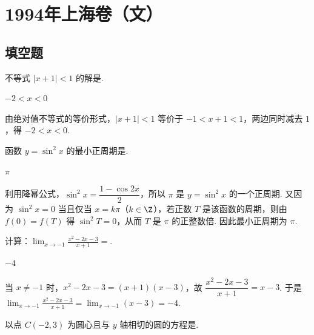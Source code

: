 \chapter{1994年上海卷（文）}
\section{填空题}

\begin{problem}
不等式 \(|x + 1| < 1 \) 的解是\fillinblank{}.
\end{problem}

\begin{answer}
\(-2 < x < 0\)
\end{answer}

\begin{solution}
由绝对值不等式的等价形式，\(|x+1|<1\) 等价于 \(-1<x+1<1\)，两边同时减去 \(1\)，得 \(-2<x<0\).
\end{solution}

\begin{problem}
函数 \(y = \sin^{2} x \) 的最小正周期是\fillinblank{}.
\end{problem}

\begin{answer}
\(\pi\)
\end{answer}

\begin{solution}
利用降幂公式，\(\sin^2x=\dfrac{1-\cos2x}{2}\)，所以 \(\pi\) 是 \(y=\sin^2x\) 的一个正周期. 又因为 \(\sin^2x=0\) 当且仅当 \(x=k\pi\)（\(k\in\Z\)），若正数 \(T\) 是该函数的周期，则由 \(f(0)=f(T)\) 得 \(\sin^2T=0\)，从而 \(T\) 是 \(\pi\) 的正整数倍. 因此最小正周期为 \(\pi\).
\end{solution}

\begin{problem}
计算：\(\displaystyle\lim_{x\to-1}\frac{x^{2}-2x-3}{x+1}= \)\fillinblank{}.
\end{problem}

\begin{answer}
\(-4\)
\end{answer}

\begin{solution}
当 \(x\ne-1\) 时，\(x^2-2x-3=(x+1)(x-3)\)，故
\(\dfrac{x^2-2x-3}{x+1}=x-3\). 于是
\(\displaystyle\lim_{x\to-1}\frac{x^2-2x-3}{x+1}=\lim_{x\to-1}(x-3)=-4\).
\end{solution}

\begin{problem}
以点 \(C(-2,3) \) 为圆心且与 \(y\) 轴相切的圆的方程是\fillinblank{}.
\end{problem}

